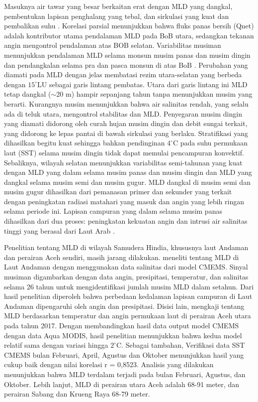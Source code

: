 \begin{spacing}{1.5}
	Masuknya air tawar yang besar berkaitan erat dengan MLD yang dangkal, pembentukan lapisan penghalang yang tebal, dan sirkulasi yang kuat dan pembalikan suhu . 	Korelasi parsial menunjukkan bahwa fluks panas bersih (Qnet) adalah kontributor utama pendalaman MLD pada BoB utara, sedangkan tekanan angin mengontrol pendalaman atas BOB selatan. Variabilitas musiman menunjukkan pendalaman MLD selama monsun musim panas dan musim dingin dan pendangkalan selama pra dan pasca monsun di atas BoB . Perubahan yang diamati pada MLD dengan jelas membatasi rezim utara-selatan yang berbeda dengan $15^\circ$LU sebagai garis lintang pembatas. Utara dari garis lintang ini MLD tetap dangkal ($\sim$20 m) hampir sepanjang tahun tanpa menunjukkan musim yang berarti. Kurangnya musim menunjukkan bahwa air salinitas rendah, yang selalu ada di teluk utara, mengontrol stabilitas dan MLD. Penyegaran musim dingin yang diamati didorong oleh curah hujan musim dingin dan debit sungai terkait, yang didorong ke lepas pantai di bawah sirkulasi yang berlaku. Stratifikasi yang dihasilkan begitu kuat sehingga bahkan pendinginan $4^\circ$C pada suhu permukaan laut (SST) selama musim dingin tidak dapat memulai pencampuran konvektif. Sebaliknya, wilayah selatan menunjukkan variabilitas semi-tahunan yang kuat dengan MLD yang dalam selama musim panas dan musim dingin dan MLD yang dangkal selama musim semi dan musim gugur. MLD dangkal di musim semi dan musim gugur dihasilkan dari pemanasan primer dan sekunder yang terkait dengan peningkatan radiasi matahari yang masuk dan angin yang lebih ringan selama periode ini. Lapisan campuran yang dalam selama musim panas dihasilkan dari dua proses: peningkatan kekuatan angin dan intrusi air salinitas tinggi yang berasal dari Laut Arab .
	
	Penelitian tentang MLD di wilayah Samudera Hindia, khususnya laut Andaman dan perairan Aceh sendiri, masih jarang dilakukan.  meneliti tentang MLD di Laut Andaman dengan menggunakan data salinitas dari model CMEMS. Sinyal musiman digambarkan dengan data angin, presipitasi, temperatur, dan salinitas selama 26 tahun untuk mengidentifikasi jumlah musim MLD dalam setahun. Dari hasil penelitian diperoleh bahwa perbedaan kedalaman lapisan campuran di Laut Andaman dipengaruhi oleh angin dan presipitasi. Disisi lain,  mengkaji tentang MLD berdasarkan temperatur dan angin permukaan laut di perairan Aceh utara pada tahun 2017. Dengan membandingkan hasil data output model CMEMS dengan data Aqua MODIS, hasil penelitian menunjukkan bahwa kedua model relatif sama dengan variasi hingga $2^\circ$C. Sebagai tambahan, Verifikasi data SST CMEMS bulan Februari, April, Agustus dan Oktober menunjukkan hasil yang cukup baik dengan nilai korelasi r = 0,8523. Analisis yang dilakukan menunjukkan bahwa MLD terdalam terjadi pada bulan Februari, Agustus, dan Oktober. Lebih lanjut, MLD di perairan utara Aceh adalah 68-91 meter, dan perairan Sabang dan Krueng Raya 68-79 meter. 
	

\end{spacing}
